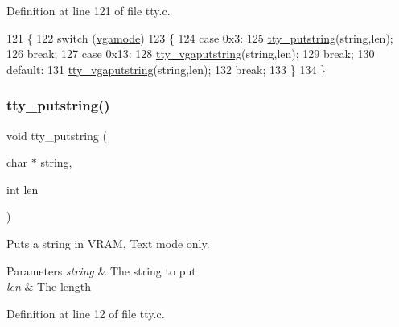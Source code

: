 Definition at line 121 of file tty.\+c.


\begin{DoxyCode}
121                                             \{
122     \textcolor{keywordflow}{switch} (\hyperlink{a00173_af93b0649fdd1bea5b6d29ed37205aa2c_af93b0649fdd1bea5b6d29ed37205aa2c}{vgamode})
123     \{
124     \textcolor{keywordflow}{case} 0x3:
125         \hyperlink{a00173_a5b5bf610a57f3c59b2851fa2652081ec_a5b5bf610a57f3c59b2851fa2652081ec}{tty\_putstring}(\textcolor{keywordtype}{string},len);
126         \textcolor{keywordflow}{break};
127     \textcolor{keywordflow}{case} 0x13:
128         \hyperlink{a00173_a05ca3f5e64f38fec173b635ca8465415_a05ca3f5e64f38fec173b635ca8465415}{tty\_vgaputstring}(\textcolor{keywordtype}{string},len);
129         \textcolor{keywordflow}{break};
130     \textcolor{keywordflow}{default}:
131         \hyperlink{a00173_a05ca3f5e64f38fec173b635ca8465415_a05ca3f5e64f38fec173b635ca8465415}{tty\_vgaputstring}(\textcolor{keywordtype}{string},len);
132         \textcolor{keywordflow}{break};
133     \}
134 \}
\end{DoxyCode}
\mbox{\label{a00173_a5b5bf610a57f3c59b2851fa2652081ec_a5b5bf610a57f3c59b2851fa2652081ec}} 
\subsubsection{\texorpdfstring{tty\+\_\+putstring()}{tty\_putstring()}}
{\footnotesize\ttfamily void tty\+\_\+putstring (\begin{DoxyParamCaption}\item[{char $\ast$}]{string,  }\item[{int}]{len }\end{DoxyParamCaption})}



Puts a string in V\+R\+AM, Text mode only. 


\begin{DoxyParams}{Parameters}
{\em string} & The string to put \\
\hline
{\em len} & The length \\
\hline
\end{DoxyParams}


Definition at line 12 of file tty.\+c.


